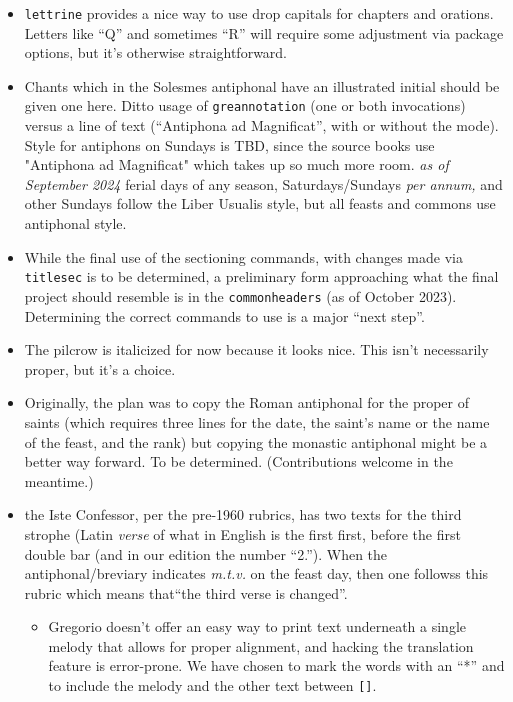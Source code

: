 \documentclass[11pt]{article}
\begin{document}
\begin{itemize}
\item
\verb|lettrine| provides a nice way to use drop capitals for chapters and orations. Letters like ``Q'' and sometimes ``R'' will require some adjustment via package options, but it's otherwise straightforward.
\item
Chants which in the Solesmes antiphonal have an illustrated initial should be given one here. Ditto usage of \verb|greannotation| (one or both invocations) versus a line of text (``Antiphona ad Magnificat'', with or without the mode). Style for antiphons on Sundays is TBD, since the source books use "Antiphona ad Magnificat" which takes up so much more room. \emph{as of September 2024} ferial days of any season, Saturdays/Sundays \textit{per annum,} and other Sundays follow the Liber Usualis style, but all feasts and commons use antiphonal style.
\item While the final use of the sectioning commands, with changes made via \verb|titlesec| is  to be determined, a preliminary form approaching what the final project should resemble is in the \verb|commonheaders| (as of October 2023). Determining the correct commands to use is a major ``next step''.
\item
The pilcrow is italicized for now because it looks nice. This isn't necessarily proper, but it's a choice.
\item
Originally, the plan was to copy the Roman antiphonal for the proper of saints (which requires three lines for the date, the saint's name or the name of the feast, and the rank) but copying the monastic antiphonal might be a better way forward. To be determined. (Contributions welcome in the meantime.)
\item the Iste Confessor, per the pre-1960 rubrics, has two texts for the third strophe (Latin \textit{verse} of what in English is the first first, before the first double bar (and in our edition the number ``2.''). When the antiphonal/breviary indicates \textit{m.t.v.} on the feast day, then one followss this rubric which means that``the third verse is changed''.

\begin{itemize}
\item
Gregorio doesn't offer an easy way to print text underneath a single melody that allows for proper alignment, and hacking the translation feature is error-prone. We have chosen to mark the words with an ``*'' and to include the melody and the other text between \verb|[]|.
\end{itemize}
\end{itemize}
\end{document}
